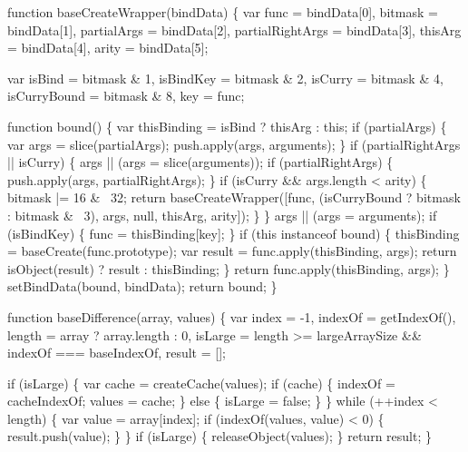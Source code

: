 \begin{DoxyCodeInclude}
    \textcolor{keyword}{function} baseCreateWrapper(bindData) \{
      var func = bindData[0],
          bitmask = bindData[1],
          partialArgs = bindData[2],
          partialRightArgs = bindData[3],
          thisArg = bindData[4],
          arity = bindData[5];

      var isBind = bitmask & 1,
          isBindKey = bitmask & 2,
          isCurry = bitmask & 4,
          isCurryBound = bitmask & 8,
          key = func;

      \textcolor{keyword}{function} bound() \{
        var thisBinding = isBind ? thisArg : \textcolor{keyword}{this};
        \textcolor{keywordflow}{if} (partialArgs) \{
          var args = slice(partialArgs);
          push.apply(args, arguments);
        \}
        \textcolor{keywordflow}{if} (partialRightArgs || isCurry) \{
          args || (args = slice(arguments));
          \textcolor{keywordflow}{if} (partialRightArgs) \{
            push.apply(args, partialRightArgs);
          \}
          \textcolor{keywordflow}{if} (isCurry && args.length < arity) \{
            bitmask |= 16 & ~32;
            \textcolor{keywordflow}{return} baseCreateWrapper([func, (isCurryBound ? bitmask : bitmask & ~3), args, null, thisArg, 
      arity]);
          \}
        \}
        args || (args = arguments);
        \textcolor{keywordflow}{if} (isBindKey) \{
          func = thisBinding[key];
        \}
        \textcolor{keywordflow}{if} (\textcolor{keyword}{this} instanceof bound) \{
          thisBinding = baseCreate(func.prototype);
          var result = func.apply(thisBinding, args);
          \textcolor{keywordflow}{return} isObject(result) ? result : thisBinding;
        \}
        \textcolor{keywordflow}{return} func.apply(thisBinding, args);
      \}
      setBindData(bound, bindData);
      \textcolor{keywordflow}{return} bound;
    \}

    \textcolor{keyword}{function} baseDifference(array, values) \{
      var index = -1,
          indexOf = getIndexOf(),
          length = array ? array.length : 0,
          isLarge = length >= largeArraySize && indexOf === baseIndexOf,
          result = [];

      \textcolor{keywordflow}{if} (isLarge) \{
        var cache = createCache(values);
        \textcolor{keywordflow}{if} (cache) \{
          indexOf = cacheIndexOf;
          values = cache;
        \} \textcolor{keywordflow}{else} \{
          isLarge = \textcolor{keyword}{false};
        \}
      \}
      \textcolor{keywordflow}{while} (++index < length) \{
        var value = array[index];
        \textcolor{keywordflow}{if} (indexOf(values, value) < 0) \{
          result.push(value);
        \}
      \}
      \textcolor{keywordflow}{if} (isLarge) \{
        releaseObject(values);
      \}
      \textcolor{keywordflow}{return} result;
    \}


\end{DoxyCodeInclude}
